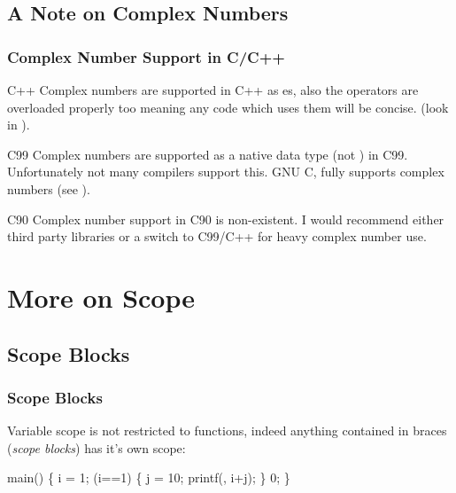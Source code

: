 \documentclass[smaller,handout,table]{beamer}
\begin{document}
\subsection{A Note on Complex Numbers}
\begin{frame}
\frametitle{Complex Number Support in C/C++}
\begin{exampleblock}{C++}
Complex numbers are supported in C++ as {\tt {}}es, also the operators are overloaded properly too meaning any code which uses them will be concise.
(look in {\tt {}}).
\end{exampleblock}

\begin{block}{C99}
Complex numbers are supported as a native data type (not {\tt {}}) in C99. Unfortunately not many compilers support this. GNU C, fully supports complex numbers (see {\tt {}}).
\end{block}

\begin{alertblock}{C90}
Complex number support in C90 is non-existent. I would recommend either third party libraries or a switch to C99/C++ for heavy complex number use.
\end{alertblock}
\end{frame}


\section{More on Scope}
\subsection{Scope Blocks}
\begin{frame}[fragile]
\frametitle{Scope Blocks}
\begin{small}
{
Variable scope is not restricted to functions, indeed anything contained in braces (\emph{scope blocks}) has it's own scope:
\vspace{-0.1in}
\begin{semiverbatim}
\kr\kl{} 
\kl
\kl{} main()
\kl\{
\kl   {} i = 1;
\kl
\kl   {} (i==1)
\kl   \{
\kl      {} j = 10; 
\kl      printf(, i+j);
\kl   \}
\kl
\kl   {}
\kl
\kl   {} 0;
\kl\}
\end{semiverbatim}
}
\end{small}
\end{frame}
\end{document}
